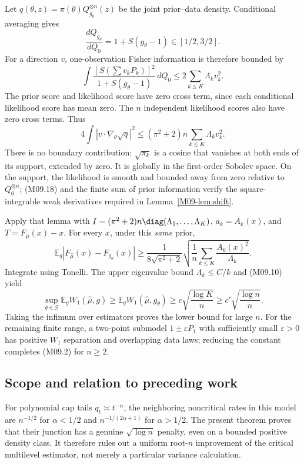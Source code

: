 \documentclass[11pt,a4paper]{article}
\theoremstyle{definition}\newtheorem{definition}[theorem]{Definition}
\theoremstyle{remark}\newtheorem{remark}[theorem]{Remark}
\newcommand{\E}{\mathbb E}\newcommand{\one}{\mathbf 1}\newcommand{\1}{\mathbf 1}
\numberwithin{equation}{section}
\begin{document}
Let $q(\theta,z)=\pi(\theta)Q_{g_\theta}^{\otimes n}(z)$ be the joint prior--data density. Conditional averaging gives
\[
 \frac{dQ_{g_\theta}}{dQ_0}=1+S(g_\theta-1)\in[1/2,3/2].
\]
For a direction $v$, one-observation Fisher information is therefore bounded by
\[
 \int\frac{[S(\sum v_kP_k)]^2}{1+S(g_\theta-1)}\,dQ_0
 \le2\sum_{k\le K}\Lambda_kv_k^2.\tag{M09.18}
\]
The prior score and likelihood score have zero cross term, since each conditional likelihood score has mean zero. The $n$ independent likelihood scores also have zero cross terms. Thus
\[
 4\int|v\cdot\nabla_\theta\sqrt q|^2
 \le(\pi^2+2)n\sum_{k\le K}\Lambda_kv_k^2.\tag{M09.19}
\]
There is no boundary contribution: $\sqrt{\pi_k}$ is a cosine that vanishes at both ends of its support, extended by zero. It is globally in the first-order Sobolev space. On the support, the likelihood is smooth and bounded away from zero relative to $Q_0^{\otimes n}$; (M09.18) and the finite sum of prior information verify the square-integrable weak derivatives required in Lemma~\ref{M09-lem:shift}.

Apply that lemma with $I=(\pi^2+2)n\diag(\Lambda_1,\ldots,\Lambda_K)$, $a_k=A_k(x)$, and $T=F_{\widehat\mu}(x)-x$. For every $x$, under this \emph{same} prior,
\[
 \E_q|F_{\widehat\mu}(x)-F_{g_\theta}(x)|
 \ge\frac1{8\sqrt{\pi^2+2}}\sqrt{\frac1n\sum_{k\le K}\frac{A_k(x)^2}{\Lambda_k}}.
\tag{M09.20}
\]
Integrate using Tonelli. The upper eigenvalue bound $\Lambda_k\le C/k$ and (M09.10) yield
\[
 \sup_{g\in\mathcal G}\E_gW_1(\widehat\mu,g)
 \ge\E_qW_1(\widehat\mu,g_\theta)
 \ge c\sqrt{\frac{\log K}n}
 \ge c'\sqrt{\frac{\log n}n}.\tag{M09.21}
\]
Taking the infimum over estimators proves the lower bound for large $n$. For the remaining finite range, a two-point submodel $1\pm\varepsilon P_1$ with sufficiently small $\varepsilon>0$ has positive $W_1$ separation and overlapping data laws; reducing the constant completes (M09.2) for $n\ge2$.

\subsection{Scope and relation to preceding work}\label{M09-sec-6}
For polynomial cap tails $q_t\asymp t^{-\alpha}$, the neighboring noncritical rates in this model are $n^{-1/2}$ for $\alpha<1/2$ and $n^{-1/(2\alpha+1)}$ for $\alpha>1/2$. The present theorem proves that their junction has a genuine $\sqrt{\log n}$ penalty, even on a bounded positive density class. It therefore rules out a uniform root-$n$ improvement of the critical multilevel estimator, not merely a particular variance calculation.
\end{document}
